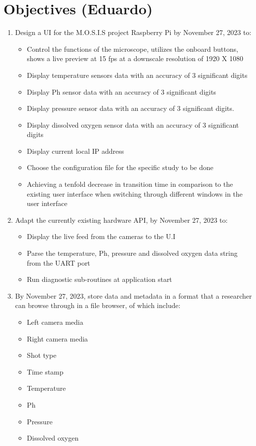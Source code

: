 \section{Objectives (Eduardo)}
\begin{enumerate}
	\item Design a UI for the M.O.S.I.S project Raspberry Pi by November 27, 2023 to:
	      \begin{itemize}
		      \item Control the functions of the microscope, utilizes the onboard buttons, shows a live preview at 15 fps at a downscale resolution of 1920 X 1080
		      \item Display temperature sensors data with an accuracy of 3 significant digits
		      \item Display Ph sensor data with an accuracy of 3 significant digits
		      \item Display pressure sensor data with an accuracy of 3 significant digits.
		      \item Display dissolved oxygen sensor data with an accuracy of 3 significant digits
		      \item Display current local IP address
		      \item Choose the configuration file for the specific study to be done
		      \item Achieving a tenfold decrease in transition time in comparison to the existing user interface when switching through different windows in the user interface
	      \end{itemize}
	\item Adapt the currently existing hardware API, by November 27, 2023 to:
	      \begin{itemize}
		      \item Display the live feed from the cameras to the U.I
		      \item Parse the temperature, Ph, pressure and dissolved oxygen data string from the UART port
		      \item Run diagnostic sub-routines at application start
	      \end{itemize}
	\item By November 27, 2023, store data and metadata in a format that a researcher can browse through in a file browser, of which include:
	      \begin{itemize}
		      \item Left camera media
		      \item Right camera media
		      \item Shot type
		      \item Time stamp
		      \item Temperature
		      \item Ph
		      \item Pressure
		      \item Dissolved oxygen
	      \end{itemize}
\end{enumerate}